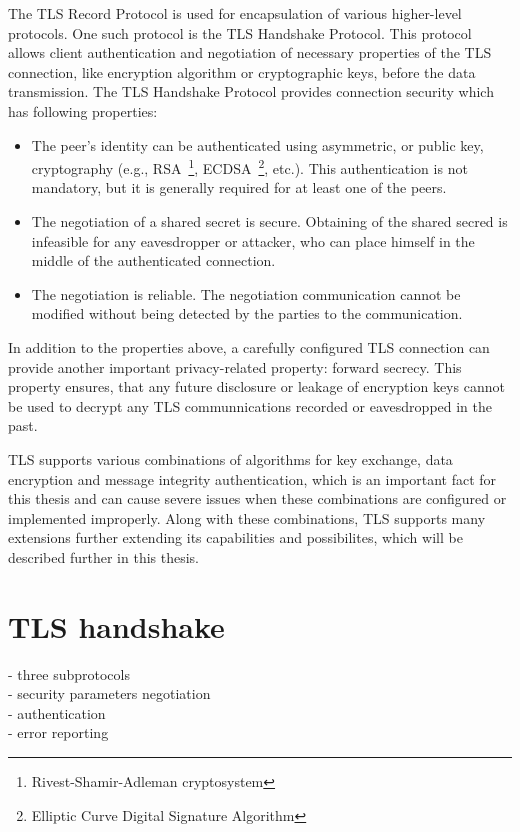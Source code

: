     The TLS Record Protocol is used for encapsulation of various higher-level
    protocols. One such protocol is the TLS Handshake Protocol. This protocol
    allows client authentication and negotiation of necessary properties
    of the TLS connection, like encryption algorithm or cryptographic keys,
    before the data transmission. The TLS Handshake Protocol provides
    connection security which has following properties:
    \begin{itemize}
        \item The peer's identity can be authenticated using asymmetric, or
        public key, cryptography (e.g.,
        RSA~\footnote{Rivest-Shamir-Adleman cryptosystem},
        ECDSA~\footnote{Elliptic Curve Digital Signature Algorithm}, etc.).
        This authentication is not mandatory, but it is generally required
        for at least one of the peers.
        \item The negotiation of a shared secret is secure. Obtaining of
        the shared secred is infeasible for any eavesdropper or attacker,
        who can place himself in the middle of the authenticated connection.
        \item The negotiation is reliable. The negotiation communication
        cannot be modified without being detected by the parties to the
        communication.~\cite{rfc5246}
    \end{itemize}

    In addition to the properties above, a carefully configured TLS connection
    can provide another important privacy-related property: forward secrecy.
    This property ensures, that any future disclosure or leakage of encryption
    keys cannot be used to decrypt any TLS communnications recorded or
    eavesdropped in the past.

    TLS supports various combinations of algorithms for key exchange, data
    encryption and message integrity authentication, which is an important fact
    for this thesis and can cause severe issues when these combinations
    are configured or implemented improperly. Along with these combinations,
    TLS supports many extensions further extending its capabilities and possibilites,
    which will be described further in this thesis.

\section{TLS handshake}
- three subprotocols \\
    - security parameters negotiation \\
    - authentication \\
    - error reporting

